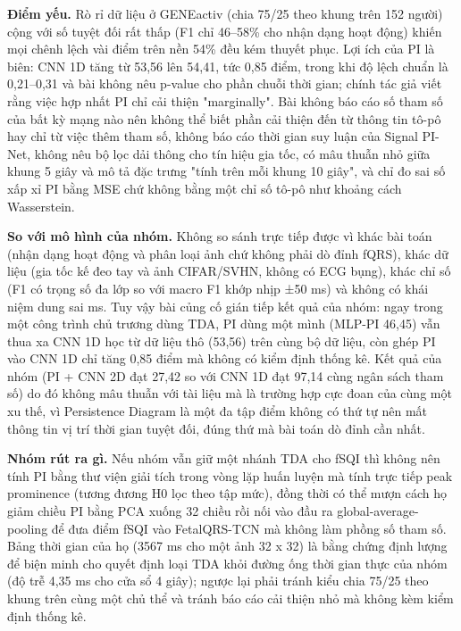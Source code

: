 \documentclass[12pt,a4paper]{article}
\begin{document}
\noindent \textbf{Điểm yếu.} Rò rỉ dữ liệu ở GENEactiv (chia 75/25 theo khung trên 152 người) cộng với số tuyệt đối rất thấp (F1 chỉ 46–58\% cho nhận dạng hoạt động) khiến mọi chênh lệch vài điểm trên nền 54\% đều kém thuyết phục. Lợi ích của PI là biên: CNN 1D tăng từ 53,56 lên 54,41, tức 0,85 điểm, trong khi độ lệch chuẩn là 0,21–0,31 và bài không nêu p-value cho phần chuỗi thời gian; chính tác giả viết rằng việc hợp nhất PI chỉ cải thiện "marginally". Bài không báo cáo số tham số của bất kỳ mạng nào nên không thể biết phần cải thiện đến từ thông tin tô-pô hay chỉ từ việc thêm tham số, không báo cáo thời gian suy luận của Signal PI-Net, không nêu bộ lọc dải thông cho tín hiệu gia tốc, có mâu thuẫn nhỏ giữa khung 5 giây và mô tả đặc trưng "tính trên mỗi khung 10 giây", và chỉ đo sai số xấp xỉ PI bằng MSE chứ không bằng một chỉ số tô-pô như khoảng cách Wasserstein.\par\vspace{3pt}
\noindent \textbf{\color{tdtblue}So với mô hình của nhóm.} Không so sánh trực tiếp được vì khác bài toán (nhận dạng hoạt động và phân loại ảnh chứ không phải dò đỉnh fQRS), khác dữ liệu (gia tốc kế đeo tay và ảnh CIFAR/SVHN, không có ECG bụng), khác chỉ số (F1 có trọng số đa lớp so với macro F1 khớp nhịp ±50 ms) và không có khái niệm dung sai ms. Tuy vậy bài củng cố gián tiếp kết quả của nhóm: ngay trong một công trình chủ trương dùng TDA, PI dùng một mình (MLP-PI 46,45) vẫn thua xa CNN 1D học từ dữ liệu thô (53,56) trên cùng bộ dữ liệu, còn ghép PI vào CNN 1D chỉ tăng 0,85 điểm mà không có kiểm định thống kê. Kết quả của nhóm (PI + CNN 2D đạt 27,42 so với CNN 1D đạt 97,14 cùng ngân sách tham số) do đó không mâu thuẫn với tài liệu mà là trường hợp cực đoan của cùng một xu thế, vì Persistence Diagram là một đa tập điểm không có thứ tự nên mất thông tin vị trí thời gian tuyệt đối, đúng thứ mà bài toán dò đỉnh cần nhất.\par\vspace{3pt}
\noindent \textbf{\color{tdtblue}Nhóm rút ra gì.} Nếu nhóm vẫn giữ một nhánh TDA cho fSQI thì không nên tính PI bằng thư viện giải tích trong vòng lặp huấn luyện mà tính trực tiếp peak prominence (tương đương H0 lọc theo tập mức), đồng thời có thể mượn cách họ giảm chiều PI bằng PCA xuống 32 chiều rồi nối vào đầu ra global-average-pooling để đưa điểm fSQI vào FetalQRS-TCN mà không làm phồng số tham số. Bảng thời gian của họ (3567 ms cho một ảnh 32 x 32) là bằng chứng định lượng để biện minh cho quyết định loại TDA khỏi đường ống thời gian thực của nhóm (độ trễ 4,35 ms cho cửa sổ 4 giây); ngược lại phải tránh kiểu chia 75/25 theo khung trên cùng một chủ thể và tránh báo cáo cải thiện nhỏ mà không kèm kiểm định thống kê.\par\vspace{3pt}
\vspace{6pt}
\end{document}
